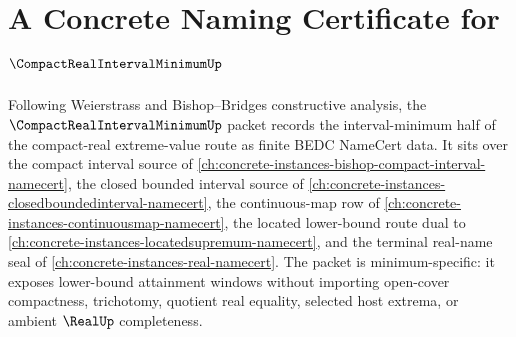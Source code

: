 \chapter{A Concrete Naming Certificate for $\CompactRealIntervalMinimumUp$}
\label{ch:concrete-instances-compact-real-interval-minimum-namecert}

Following Weierstrass and Bishop--Bridges constructive analysis, the $\CompactRealIntervalMinimumUp$ packet records the interval-minimum half of the compact-real extreme-value route as finite BEDC NameCert data. It sits over the compact interval source of \autoref{ch:concrete-instances-bishop-compact-interval-namecert}, the closed bounded interval source of \autoref{ch:concrete-instances-closedboundedinterval-namecert}, the continuous-map row of \autoref{ch:concrete-instances-continuousmap-namecert}, the located lower-bound route dual to \autoref{ch:concrete-instances-locatedsupremum-namecert}, and the terminal real-name seal of \autoref{ch:concrete-instances-real-namecert}. The packet is minimum-specific: it exposes lower-bound attainment windows without importing open-cover compactness, trichotomy, quotient real equality, selected host extrema, or ambient $\RealUp$ completeness.

